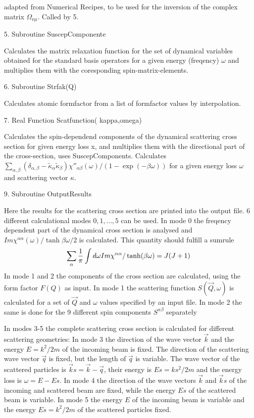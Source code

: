 adapted from Numerical Recipes, to be used for the inversion of the complex
matrix $\Omega_{\nu\mu}$. Called by 5. 

5. Subroutine SuscepComponente

Calculates the matrix relaxation function for the set of dynamical variables
obtained for the standard basis operators for a given energy (freqency)
$\omega$ and multiplies them with the coresponding spin-matrix-elements.

6. Subroutine Strfak(Q)

Calculates atomic formfactor from a list of formfactor values by
interpolation. 

7. Real Function Scatfunction( kappa,omega) 

Calculates the spin-dependend components of the dynamical scattering
cross section for given energy loss x, and multiplies them with the
directional part of the cross-section, uses SuscepComponents.
Calculates 
$\sum_{\alpha,\beta} (\delta_{\alpha, \beta}- \tilde \kappa_\alpha \tilde
\kappa_\beta) \chi''_{\alpha \beta}(\omega)/(1-\exp(-\beta\omega))$
for a given energy loss $\omega$ and scattering vector $\kappa$.


9. Subroutine OutputResults 

Here the results for the scattering cross section are printed into the
output file. 
6 different calculational modes $0,1,\dots ,5$ can be used. In mode 0 the
freqency dependent part of the dynamical cross section is analysed and $Im
\chi^{\alpha\alpha}(\omega)/\tanh{\beta\omega/2}$ is calculated. This
quantity should fulfill a sumrule 
$$
\sum_\alpha {1\over\pi}\int d\omega Im \chi^{\alpha\alpha}/\tanh(\beta\omega) 
= J(J+1) 
$$
In mode 1 and 2 the components of the cross section are calculated,
using the form factor $F(Q)$ as input. In mode 1 the
scattering function $S(\vec Q,\omega)$ is calculated for a set of $\vec
Q$ and $\omega $ values specified by an input file. In mode 2 the same
is done for the 9 different spin components $S^{\alpha\beta}$ separately 

In modes 3-5
the complete scattering cross section is calculated for different scattering
geometries: In mode 3 the  
direction of the wave vector $\vec k$ and the energy $E=k^2/2m$ of the incoming 
beam is fixed. The direction of the scattering wave vector $\vec q$ is fixed, 
but the 
length of $\vec q$ is variable. The wave vector of the scattered
particles is  $\vec ks=\vec k-\vec q$, their energy is $Es=ks^2/2m$ and
the energy loss is $\omega =E-Es$. In mode 4 the direction  of the wave vectors 
$\vec k$ and $\vec ks$ of the incoming and scattered beam
are fixed, while the energy $Es$ of the scattered beam is variable. In mode 5
the energy $E$ of the incoming beam is variable 
and the energy $Es=k^2/2m$ of the scattered particles  fixed.  




